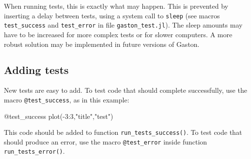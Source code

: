 \documentclass[11pt]{article}
\newcommand{\cmd}[1]{\texttt{#1}}
\begin{document}
When running tests, this is exactly what may happen. This is prevented by
inserting a delay between tests, using a system call to \cmd{sleep} (see macros
\cmd{test\_success} and \cmd{test\_error} in file \cmd{gaston\_test.jl}). The
sleep amounts may have to be increased for more complex tests or for slower
computers.  A more robust solution may be implemented in future versions of
Gaston.

\subsection{Adding tests}

New tests are easy to add. To test code that should complete successfully,
use the macro \cmd{@test\_success}, as in this example:
\begin{juliacode}
@test_success plot(-3:3,"title","test")
\end{juliacode}
This code should be added to function \cmd{run\_tests\_success()}. To test code
that should produce an error, use the macro \cmd{@test\_error} inside function
\cmd{run\_tests\_error()}.
\end{document}
